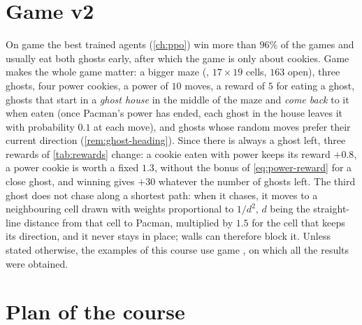 \section{Game v2}
\label{sec:v2}

On game  the best trained agents (\cref{ch:ppo}) win more than
$96\%$ of the games and
usually eat both ghosts early, after which the game is only about cookies.
Game  makes the whole game matter: a bigger maze
(, $17 \times 19$ cells, $163$ open), three ghosts, four
power cookies, a power of $10$ moves, a reward of $5$ for eating a ghost,
ghosts that start in a \emph{ghost house} in the middle of the maze and
\emph{come back} to it when eaten (once Pacman's power has ended, each
ghost in the house leaves it with probability $0.1$ at each move), and
ghosts whose random moves prefer their current direction
(\cref{rem:ghost-heading}). Since there is always a ghost left, three rewards
of \cref{tab:rewards} change: a cookie eaten with power keeps its reward
$+0.8$, a power cookie is worth a fixed $1.3$, without the bonus of
\eqref{eq:power-reward} for a close ghost, and winning gives $+30$ whatever
the number of ghosts left. The third ghost does not chase along a shortest
path: when it chases, it moves to a neighbouring cell drawn with weights
proportional to
$1/d^2$, $d$ being the straight-line distance from that cell to Pacman,
multiplied by $1.5$ for the cell that keeps its direction, and it never
stays in place; walls can therefore block it. Unless stated
otherwise, the examples of this course use game , on which all the
results were obtained.

\section{Plan of the course}

